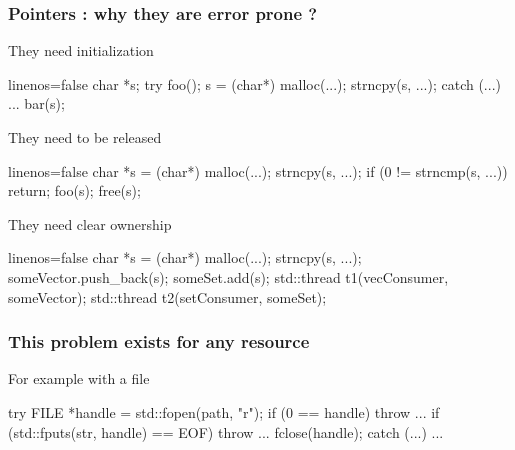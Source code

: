 \begin{frame}[fragile]
  \frametitle{Pointers : why they are error prone ?}
  \begin{exampleblock}{They need initialization
      \hfill {}}
    \begin{cppcode*}{linenos=false}
      char *s;
      try {
        foo();
        s = (char*) malloc(...);
        strncpy(s, ...);
      } catch (...) { ... }
      bar(s);
    \end{cppcode*}
  \end{exampleblock}
  \pause
  \pause
  \vspace{-2cm}
  \begin{exampleblock}{They need to be released
      \hfill {}}
    \begin{cppcode*}{linenos=false}
      char *s = (char*) malloc(...);
      strncpy(s, ...);
      if (0 != strncmp(s, ...)) return;
      foo(s);
      free(s);
    \end{cppcode*}
  \end{exampleblock}
  \pause
  \pause
  \vspace{-2cm}
  \begin{exampleblock}{They need clear ownership
      \hfill {}}
    \begin{cppcode*}{linenos=false}
      char *s = (char*) malloc(...);
      strncpy(s, ...);
      someVector.push_back(s);
      someSet.add(s);
      std::thread t1(vecConsumer, someVector);
      std::thread t2(setConsumer, someSet);
    \end{cppcode*}
  \end{exampleblock}
\end{frame}

\begin{frame}[fragile]
  \frametitle{This problem exists for any resource}
  \begin{exampleblock}{For example with a file}
    \begin{cppcode*}{}
      try {
        FILE *handle = std::fopen(path, "r");
        if (0 == handle) { throw ... }
        if (std::fputs(str, handle) == EOF) {
          throw ...
        }
        fclose(handle);
      } catch (...) { ... }
    \end{cppcode*}
  \end{exampleblock}
\end{frame}

